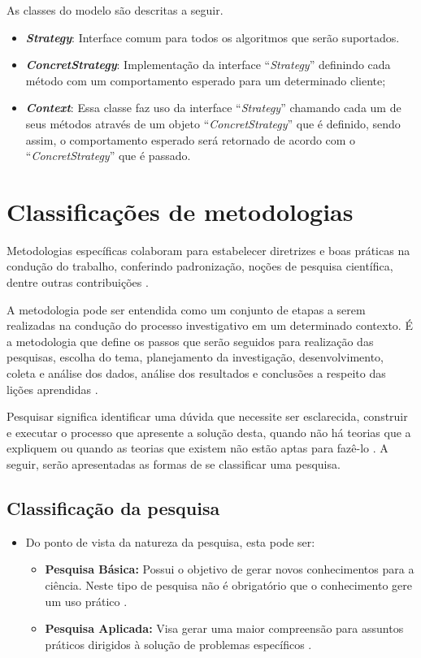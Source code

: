 \begin{apendicesenv}
As classes do modelo são descritas a seguir.

\begin{itemize}
	\item \textbf{\textit{Strategy}}: Interface comum para todos os algoritmos que serão suportados.
	\item \textbf{\textit{ConcretStrategy}}: Implementação da interface ``\textit{Strategy}'' definindo cada método com um comportamento esperado para um determinado cliente;
	\item \textbf{\textit{Context}}: Essa classe faz uso da interface ``\textit{Strategy}'' chamando cada um de seus métodos através de um objeto ``\textit{ConcretStrategy}'' que é definido, sendo assim,  o comportamento esperado será retornado de acordo com o ``\textit{ConcretStrategy}'' que é passado.
\end{itemize}

\chapter{Classificações de metodologias}
\label{apend_chap:metodologia}

Metodologias específicas colaboram para estabelecer diretrizes e boas práticas na condução do trabalho, conferindo padronização, noções de pesquisa científica, dentre outras contribuições \cite{Wohlin:2000}.

A metodologia pode ser entendida como um conjunto de etapas a serem realizadas na condução do processo investigativo em um determinado contexto. É a metodologia que define os passos que serão seguidos para realização das pesquisas, escolha do tema, planejamento da investigação, desenvolvimento, coleta e análise dos dados, análise dos resultados e conclusões a respeito das lições aprendidas \cite{Moresi:2003}.

Pesquisar significa identificar uma dúvida que necessite ser esclarecida, construir e executar o processo que apresente a solução desta, quando não há teorias que a expliquem ou quando as teorias que existem não estão aptas para fazê-lo \cite{Koche:1997}. A seguir, serão apresentadas as formas de se classificar uma pesquisa.

\section{Classificação da pesquisa}

\begin{itemize}
	\item Do ponto de vista da natureza da pesquisa, esta pode ser:
		\begin{itemize}
			\item \textbf{Pesquisa Básica:} Possui o objetivo de gerar novos conhecimentos para a ciência. Neste tipo de pesquisa não é obrigatório que o conhecimento gere um uso prático \cite{Silva:Tafner:2007}.
			\item \textbf{Pesquisa Aplicada:} Visa gerar uma maior compreensão para assuntos práticos dirigidos à solução de problemas específicos \cite{Silva:Tafner:2007}.
		\end{itemize}


\end{itemize}
\end{apendicesenv}
